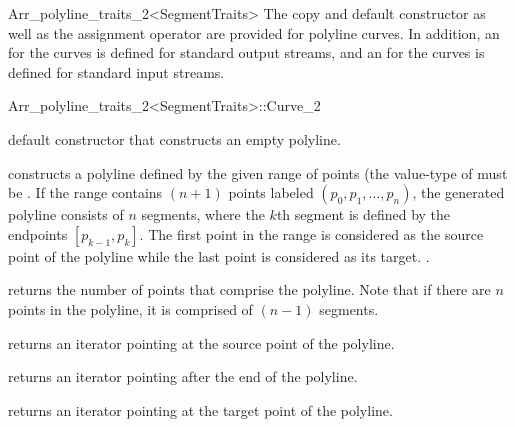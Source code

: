 \begin{ccRefClass}{Arr_polyline_traits_2<SegmentTraits>}
The copy and default constructor as well as 
the assignment operator are provided for polyline curves. In addition, 
an  for the curves is defined for standard output streams,
and an  for the curves is defined for standard input streams.

\begin{ccClass}{Arr_polyline_traits_2<SegmentTraits>::Curve_2}

\ccTypes



\ccCreation
{}

  {default constructor that constructs an empty polyline.}

  {constructs a polyline defined by the given range of points
   \ccc{[first, last)} (the value-type of  must be
   .
   If the range contains $(n + 1)$ points labeled $(p_{0},p_{1},\ldots,p_{n})$,
   the generated polyline consists of $n$ segments, where the $k$th segment 
   is defined by the endpoints $[p_{k-1},p_{k}]$. The first point in the 
   range is considered as the source point of the polyline while the last 
   point is considered as its target.
   .}

\ccAccessFunctions

  {returns the number of points that comprise the polyline.
   Note that if there are $n$ points in the polyline, it is comprised
   of $(n - 1)$ segments.}

  {returns an iterator pointing at the source point of the polyline.}

  {returns an iterator pointing after the end of the polyline.}

  {returns an iterator pointing at the target point of the polyline.}


\end{ccClass}
\end{ccRefClass}
